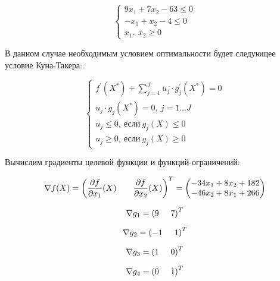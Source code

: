 \begin{equation*}
	\begin{cases}
		9 x_1 + 7 x_2 - 63 \leq 0
		\\
		-x_1 + x_2 - 4 \leq 0
		\\
		x_1,\ x_2 \geq 0
	\end{cases}
\end{equation*}

В данном случае необходимым условием оптимальности будет следующее условие Куна-Такера:

\begin{equation}
\label{eq:kt}
	\begin{cases}
		f^{'}(X^*) + \sum\limits_{j = 1}^J u_j \cdot g^{'}_j(X^*) = 0
		\\
		u_j \cdot g_j(X^*) = 0,\ j = 1 \dots J
		\\
		u_j \leq 0,\ \text{если}\ g_j(X) \leq 0
		\\
		u_j \geq 0,\ \text{если}\ g_j(X) \geq 0
	\end{cases}
\end{equation}

Вычислим градиенты целевой функции и функций-ограничений:

\begin{equation*}
	\nabla f(X) = \left(  \frac{\partial f}{\partial x_1}(X) \hspace{7mm} \frac{\partial f}{\partial x_2}(X) \right)^T = \begin{pmatrix}
		-34 x_1 + 8 x_2 + 182
		\\
		-46 x_2 + 8 x_1 + 266
	\end{pmatrix}
\end{equation*}

\begin{equation*}
	\nabla g_1 = \left( 9 \hspace{5mm} 7 \right)^T
\end{equation*}

\begin{equation*}
	\nabla g_2 = \left( -1 \hspace{5mm} 1 \right)^T
\end{equation*}

\begin{equation*}
	\nabla g_3 = \left( 1 \hspace{5mm} 0 \right)^T
\end{equation*}

\begin{equation*}
	\nabla g_4 = \left( 0 \hspace{5mm} 1 \right)^T
\end{equation*}

